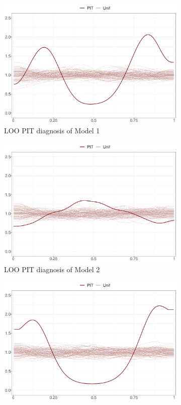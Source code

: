 \documentclass[a4paper]{article}   	%
\begin{document}
	\begin{figure}[!htp]
		\centering
		\begin{subfigure}[t]{0.45\textwidth}
			\includegraphics[width=\linewidth]{Images/pit_GSRNS_scale.pdf}
			\caption{LOO PIT diagnosis of Model 1}
		\end{subfigure}
		\begin{subfigure}[t]{0.45\textwidth}
			\includegraphics[width=\linewidth]{Images/pit_GSRand_scale.pdf}
			\caption{LOO PIT diagnosis of Model 2}
		\end{subfigure}
		\begin{subfigure}[t]{0.45\textwidth}
			\includegraphics[width=\linewidth]{Images/pit_STRNS_scale.pdf}

\end{subfigure}
\end{figure}
\end{document}
